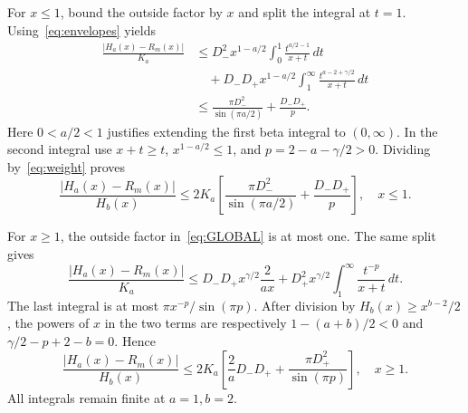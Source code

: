 \documentclass[11pt]{article}
\numberwithin{equation}{section}
\begin{document}
For $x\le1$, bound the outside factor by $x$ and split the integral
at $t=1$. Using~\eqref{eq:envelopes} yields
\begin{align*}
 \frac{|H_a(x)-R_m(x)|}{K_a}
 &\le D_-^2x^{1-a/2}\int_0^1\frac{t^{a/2-1}}{x+t}\,dt\\
 &\quad+D_-D_+x^{1-a/2}
                    \int_1^\infty\frac{t^{a-2+\gamma/2}}{x+t}\,dt\\
 &\le \frac{\pi D_-^2}{\sin(\pi a/2)}+\frac{D_-D_+}{p}.
\end{align*}
Here $0<a/2<1$ justifies extending the first beta integral to
$(0,\infty)$. In the second integral use $x+t\ge t$,
$x^{1-a/2}\le1$, and $p=2-a-\gamma/2>0$.
Dividing by~\eqref{eq:weight} proves
\begin{equation}\label{eq:LEFT}
 \frac{|H_a(x)-R_m(x)|}{H_b(x)}
 \le2K_a\left[\frac{\pi D_-^2}{\sin(\pi a/2)}
                         +\frac{D_-D_+}{p}\right],\quad x\le1.
\end{equation}

For $x\ge1$, the outside factor in~\eqref{eq:GLOBAL} is at most one.
The same split gives
\[
 \frac{|H_a(x)-R_m(x)|}{K_a}
 \le D_-D_+x^{\gamma/2}\frac{2}{ax}
   +D_+^2x^{\gamma/2}\int_1^\infty\frac{t^{-p}}{x+t}\,dt.
\]
The last integral is at most $\pi x^{-p}/\sin(\pi p)$.
After division by $H_b(x)\ge x^{b-2}/2$, the powers of $x$ in the
two terms are respectively $1-(a+b)/2<0$ and
$\gamma/2-p+2-b=0$. Hence
\begin{equation}\label{eq:RIGHT}
 \frac{|H_a(x)-R_m(x)|}{H_b(x)}
 \le2K_a\left[\frac2aD_-D_+
                         +\frac{\pi D_+^2}{\sin(\pi p)}\right],\quad x\ge1.
\end{equation}
All integrals remain finite at $a=1,b=2$.
\end{document}
